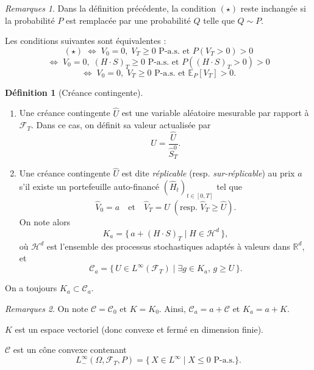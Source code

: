 \documentclass[12pt,a4paper]{article}
\numberwithin{equation}{section}
\theoremstyle{plain} %
\theoremstyle{definition} %
\newtheorem{definition}{Définition}          %
\theoremstyle{remark} %
\newtheorem*{remarques}{Remarques}
\theoremstyle{myexample}
\theoremstyle{definition}
\newcommand{\E}{\mathbb{E}}
\begin{document}
\begin{remarques}
\item[(a)] Dans la définition précédente, la condition $(\star)$ reste inchangée si la probabilité $P$ est remplacée par une probabilité $Q$ telle que $Q \sim P$.

\item[(b)] Les conditions suivantes sont équivalentes :
\[
(\star)
\;\Longleftrightarrow\;
V_0 = 0, \; V_T \ge 0 \text{ P-a.s. et } P(V_T > 0) > 0
\]
\[
\Longleftrightarrow\;
V_0 = 0, \; (H \cdot S)_T \ge 0 \text{ P-a.s. et } P((H \cdot S)_T > 0) > 0
\]
\[
\Longleftrightarrow\;
V_0 = 0, \; V_T \ge 0 \text{ P-a.s. et } \E_P[V_T] > 0.
\]
\end{remarques}

\begin{definition}[Créance contingente]
\begin{enumerate}[label=(\alph*)]
\item Une créance contingente $\hat U$ est une variable aléatoire mesurable par rapport à $\mathcal{F}_T$.  
Dans ce cas, on définit sa valeur actualisée par
\[
U = \frac{\hat U}{\hat S_T^0}.
\]

\item Une créance contingente $\hat U$ est dite \emph{réplicable} (resp. \emph{sur-réplicable}) au prix $a$ s’il existe un portefeuille auto-financé $(\hat H_t)_{t\in[0,T]}$ tel que
\[
\hat V_0 = a \quad \text{et} \quad \hat V_T = \hat U \; (\text{resp. } \hat V_T \ge \hat U).
\]
On note alors
\[
K_a = \bigl\{\, a + (H \cdot S)_T \;|\; H \in \mathcal{H}^d \,\bigr\},
\]
où $\mathcal{H}^d$ est l’ensemble des processus stochastiques adaptés à valeurs dans $\mathbb{R}^d$, et
\[
\mathcal{C}_a = \bigl\{\, U \in L^\infty(\mathcal{F}_T) \;|\; \exists g \in K_a,\, g \ge U \,\bigr\}.
\]
\end{enumerate}
On a toujours $K_a \subset \mathcal{C}_a$.
\end{definition}

\begin{remarques}
\item[(a)] On note $\mathcal{C} = \mathcal{C}_0$ et $K = K_0$. Ainsi, $\mathcal{C}_a = a + \mathcal{C}$ et $K_a = a + K$.

\item[(b)] $K$ est un espace vectoriel (donc convexe et fermé en dimension finie).

\item[(c)] $\mathcal{C}$ est un cône convexe contenant
\[
L_-^\infty(\Omega, \mathcal{F}_T, P) = \{\, X \in L^\infty \mid X \le 0 \text{ P-a.s.} \}.
\]
\end{remarques}
\end{document}
